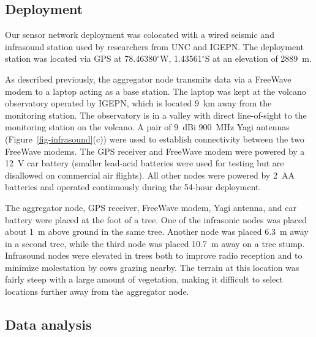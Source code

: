 \subsection{Deployment}


Our sensor network deployment was colocated with a wired seismic and
infrasound station used by researchers from UNC and IGEPN.  The deployment
station was located via GPS at 78.46380$^\circ$W, 1.43561$^\circ$S at
an elevation of 2889~m. 

As described previously, the aggregator node transmits data via a FreeWave
modem to a laptop acting as a base station. The laptop was kept at the 
volcano observatory operated by IGEPN, which is located 9~km away from 
the monitoring station. The observatory is in a valley with direct
line-of-sight to the monitoring station on the volcano.
A pair of 9~dBi 900~MHz Yagi antennas (Figure~\ref{fig-infrasound}(c)) were used to
establish connectivity between the two FreeWave modems. The GPS receiver
and FreeWave modem were powered by a 12~V car battery (smaller lead-acid
batteries were used for testing but are disallowed on commercial air
flights). All other nodes were powered by 2~AA batteries and operated
continuously during the 54-hour deployment.

The aggregator node, GPS receiver, FreeWave modem, Yagi antenna, and
car battery were placed at the foot of a tree. One of the infrasonic
nodes was placed about 1~m above ground in the same tree. Another node was
placed 6.3~m away in a second tree, while the third node was placed
10.7~m away on a tree stump. Infrasound nodes were elevated in trees both to
improve radio reception and to minimize molestation by cows grazing nearby.
The terrain at this location was fairly steep with a large amount of
vegetation, making it difficult to select locations further away from the
aggregator node.


\subsection{Data analysis}

